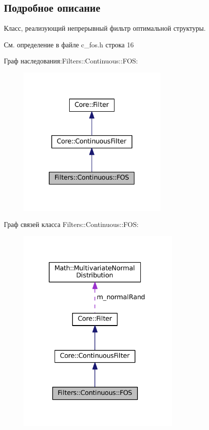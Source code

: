 \subsection{Подробное описание}
Класс, реализующий непрерывный фильтр оптимальной структуры. 

См. определение в файле c\+\_\+fos.\+h строка 16



Граф наследования\+:Filters\+:\+:Continuous\+:\+:F\+OS\+:
\nopagebreak
\begin{figure}[H]
\begin{center}
\leavevmode
\includegraphics[width=211pt]{class_filters_1_1_continuous_1_1_f_o_s__inherit__graph}
\end{center}
\end{figure}


Граф связей класса Filters\+:\+:Continuous\+:\+:F\+OS\+:
\nopagebreak
\begin{figure}[H]
\begin{center}
\leavevmode
\includegraphics[width=229pt]{class_filters_1_1_continuous_1_1_f_o_s__coll__graph}
\end{center}
\end{figure}


